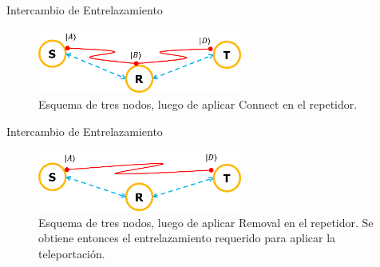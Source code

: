 \documentclass[10pt]{beamer}
\renewenvironment{block}[1]
    {\begin{oldblock}{#1}
        \smallskip
    }
    {
    \end{oldblock}
    }
\begin{document}
\begin{frame}{Intercambio de Entrelazamiento}
  \begin{block}{}
    \begin{figure}
      \includegraphics[width=0.6\textwidth]{Imagen3.png}
      \caption{Esquema de tres nodos, luego de aplicar Connect en el repetidor.}
    \end{figure}
  \end{block}
\end{frame}
\begin{frame}{Intercambio de Entrelazamiento}
  \begin{block}{}
    \begin{figure}
      \includegraphics[width=0.6\textwidth]{Imagen4.png}
      \caption{Esquema de tres nodos, luego de aplicar Removal en el repetidor. Se obtiene entonces el entrelazamiento requerido para aplicar la teleportación.}
    \end{figure}
  \end{block}
\end{frame}
\end{document}

